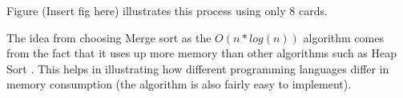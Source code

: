 Figure (Insert fig here) illustrates this process using only 8 cards.

The idea from choosing Merge sort as the $O(n * log(n))$ algorithm comes from the fact that it uses up more memory than other algorithms such as Heap Sort \cite{Mergesort}. This helps in illustrating how different programming languages differ in memory consumption (the algorithm is also fairly easy to implement). 





